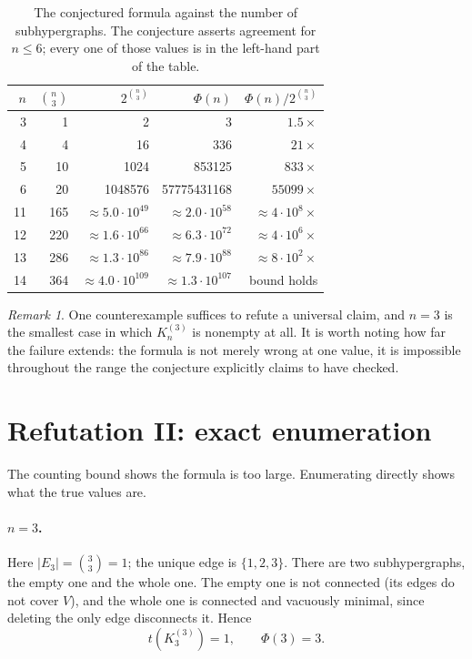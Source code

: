 \documentclass[11pt]{article}
\theoremstyle{remark}
\newtheorem{remark}{Remark}
\begin{document}
\begin{table}[h]
\centering
\begin{tabular}{rrrrr}
\toprule
$n$ & $\binom{n}{3}$ & $2^{\binom{n}{3}}$ & $\Phi(n)$ & $\Phi(n)/2^{\binom{n}{3}}$ \\
\midrule
3 & 1   & 2        & 3            & $1.5\times$ \\
4 & 4   & 16       & 336          & $21\times$ \\
5 & 10  & 1024     & 853125       & $833\times$ \\
6 & 20  & 1048576  & 57775431168  & $55099\times$ \\
\midrule
11 & 165 & $\approx 5.0\cdot 10^{49}$  & $\approx 2.0\cdot 10^{58}$  & $\approx 4\cdot 10^{8}\times$ \\
12 & 220 & $\approx 1.6\cdot 10^{66}$  & $\approx 6.3\cdot 10^{72}$  & $\approx 4\cdot 10^{6}\times$ \\
13 & 286 & $\approx 1.3\cdot 10^{86}$  & $\approx 7.9\cdot 10^{88}$  & $\approx 8\cdot 10^{2}\times$ \\
14 & 364 & $\approx 4.0\cdot 10^{109}$ & $\approx 1.3\cdot 10^{107}$ & bound holds \\
\bottomrule
\end{tabular}
\caption{The conjectured formula against the number of subhypergraphs. The
conjecture asserts agreement for $n \le 6$; every one of those values is in the
left-hand part of the table.}
\label{tab:bound}
\end{table}

\begin{remark}
One counterexample suffices to refute a universal claim, and $n = 3$ is the
smallest case in which $K_n^{(3)}$ is nonempty at all. It is worth noting how
far the failure extends: the formula is not merely wrong at one value, it is
impossible throughout the range the conjecture explicitly claims to have checked.
\end{remark}

\section{Refutation II: exact enumeration}

The counting bound shows the formula is too large. Enumerating directly shows
what the true values are.

\paragraph{$n = 3$.} Here $|E_3| = \binom{3}{3} = 1$; the unique edge is
$\{1,2,3\}$. There are two subhypergraphs, the empty one and the whole one. The
empty one is not connected (its edges do not cover $V$), and the whole one is
connected and vacuously minimal, since deleting the only edge disconnects it.
Hence
\[
  t(K_3^{(3)}) = 1, \qquad \Phi(3) = 3.
\]
\end{document}
